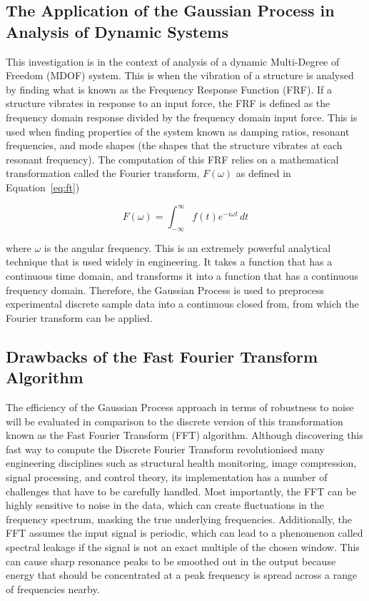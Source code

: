 \documentclass[12pt]{article}
\begin{document}
    \subsection{The Application of the Gaussian Process in Analysis of Dynamic Systems}

    This investigation is in the context of analysis of a dynamic Multi-Degree of Freedom (MDOF) system.
    This is when the vibration of a structure is analysed by finding what is known as the Frequency Response Function (FRF). If a structure vibrates in response to an input force, the FRF is defined as the frequency domain response divided by the frequency domain input force.
    This is used when finding properties of the system known as damping ratios, resonant frequencies, and mode shapes (the shapes that the structure vibrates at each resonant frequency).
    The computation of this FRF relies on a mathematical transformation called the Fourier transform, $F(\omega)$ as defined in Equation~\ref{eq:ft})

    \begin{equation}
        F(\omega) = \int_{-\infty}^{\infty} f(t) e^{-i \omega t} \, dt\label{eq:ft}
    \end{equation}


    where $\omega$ is the angular frequency.
    This is an extremely powerful analytical technique that is used widely in engineering.
    It takes a function that has a continuous time domain, and transforms it into a function that has a continuous frequency domain.
    Therefore, the Gaussian Process is used to preprocess experimental discrete sample data into a continuous closed from, from which the Fourier transform can be applied.

    \subsection{Drawbacks of the Fast Fourier Transform Algorithm}
    The efficiency of the Gaussian Process approach in terms of robustness to noise will be evaluated in comparison to the discrete version of this transformation known as the Fast Fourier Transform (FFT) algorithm.
    Although discovering this fast way to compute the Discrete Fourier Transform revolutionised many engineering disciplines such as structural health monitoring, image compression, signal processing, and control theory\cite{Byjus2023}, its implementation has a number of challenges that have to be carefully handled.
    Most importantly, the FFT can be highly sensitive to noise in the data, which can create fluctuations in the frequency spectrum, masking the true underlying frequencies\cite{MathStackExchange2023}.
    Additionally, the FFT assumes the input signal is periodic, which can lead to a phenomenon called spectral leakage if the signal is not an exact multiple of the chosen window\cite{MathStackExchange2023}.
    This can cause sharp resonance peaks to be smoothed out in the output because energy that should be concentrated at a peak frequency is spread across a range of frequencies nearby.
\end{document}
